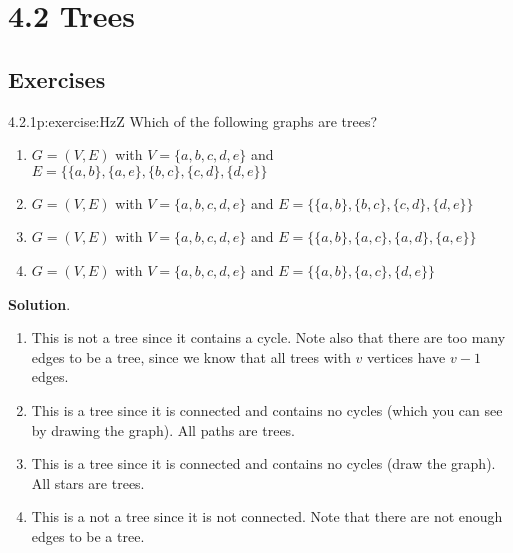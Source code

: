 \documentclass[twoside,11pt,]{book}
\newcommand{\blocktitlefont}{\relax}
\numberwithin{equation}{chapter}
\begin{document}
\section*{4.2 Trees}
\subsection*{Exercises}
\begin{divisionsolution}{4.2.1}{}{p:exercise:HzZ}%
Which of the following graphs are trees?%
\begin{enumerate}[label=(\alph*)]
\item{}\(G = (V, E)\) with \(V = \{a, b, c, d, e\}\) and \(E = \{\{a, b\}, \{a,e\}, \{b, c\}, \{c,d\}, \{d,e\} \}\)%
\item{}\(G = (V, E)\) with \(V = \{a, b, c, d, e\}\) and \(E = \{\{a, b\}, \{b, c\}, \{c,d\}, \{d,e\}\}\)%
\item{}\(G = (V, E)\) with \(V = \{a, b, c, d, e\}\) and \(E = \{\{a, b\}, \{a, c\}, \{a,d\}, \{a,e\}\}\)%
\item{}\(G = (V, E)\) with \(V = \{a, b, c, d, e\}\) and \(E = \{\{a, b\}, \{a, c\}, \{d,e\}\}\)%
\end{enumerate}
%
\par\smallskip%
\noindent\textbf{\blocktitlefont Solution}.\quad{}%
\begin{enumerate}[label=(\alph*)]
\item{}This is not a tree since it contains a cycle. Note also that there are too many edges to be a tree, since we know that all trees with \(v\) vertices have \(v-1\) edges.%
\item{}This is a tree since it is connected and contains no cycles (which you can see by drawing the graph). All paths are trees.%
\item{}This is a tree since it is connected and contains no cycles (draw the graph). All stars are trees.%
\item{}This is a not a tree since it is not connected. Note that there are not enough edges to be a tree.%
\end{enumerate}
%
\end{divisionsolution}%
\end{document}
